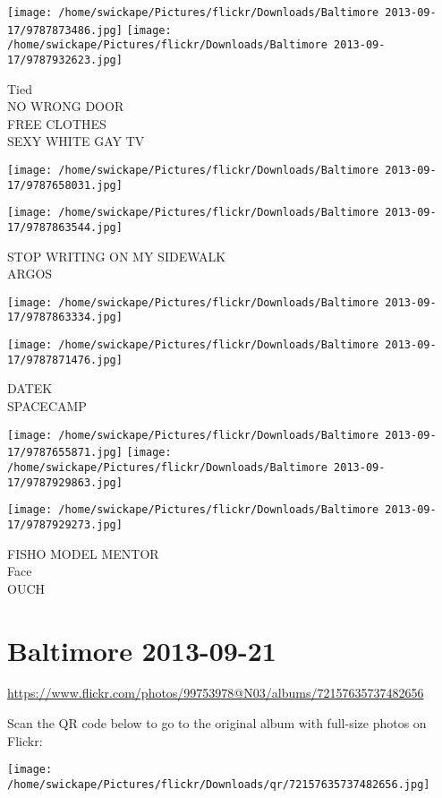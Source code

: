 \documentclass[10pt,letterpaper]{article}
\begin{document}
\texttt{[image: /home/swickape/Pictures/flickr/Downloads/Baltimore 2013-09-17/9787873486.jpg]}
\texttt{[image: /home/swickape/Pictures/flickr/Downloads/Baltimore 2013-09-17/9787932623.jpg]}

Tied\\
NO WRONG DOOR\\
FREE CLOTHES\\
SEXY WHITE GAY TV
\pagebreak

\texttt{[image: /home/swickape/Pictures/flickr/Downloads/Baltimore 2013-09-17/9787658031.jpg]}

\vspace{0.25in}
\texttt{[image: /home/swickape/Pictures/flickr/Downloads/Baltimore 2013-09-17/9787863544.jpg]}

STOP WRITING ON MY SIDEWALK\\
ARGOS
\pagebreak

\texttt{[image: /home/swickape/Pictures/flickr/Downloads/Baltimore 2013-09-17/9787863334.jpg]}

\vspace{0.25in}
\texttt{[image: /home/swickape/Pictures/flickr/Downloads/Baltimore 2013-09-17/9787871476.jpg]}

DATEK\\
SPACECAMP
\pagebreak

\texttt{[image: /home/swickape/Pictures/flickr/Downloads/Baltimore 2013-09-17/9787655871.jpg]}
\texttt{[image: /home/swickape/Pictures/flickr/Downloads/Baltimore 2013-09-17/9787929863.jpg]}

\texttt{[image: /home/swickape/Pictures/flickr/Downloads/Baltimore 2013-09-17/9787929273.jpg]}

FISHO MODEL MENTOR\\
Face\\
OUCH
\pagebreak

\section*{Baltimore 2013-09-21}

\url{https://www.flickr.com/photos/99753978@N03/albums/72157635737482656}

Scan the QR code below to go to the original album with full-size photos on Flickr:

\texttt{[image: /home/swickape/Pictures/flickr/Downloads/qr/72157635737482656.jpg]}
\pagebreak
\end{document}
